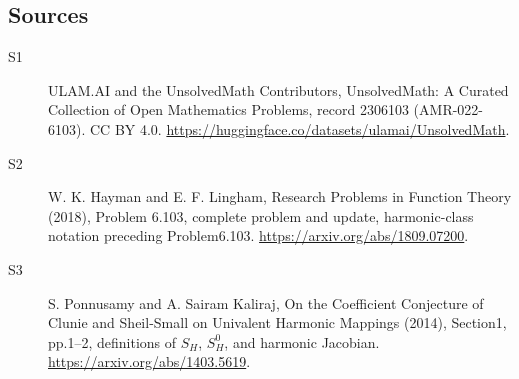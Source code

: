 \documentclass[11pt]{article}
\begin{document}
\subsection{Sources}
\begin{description}
\item[\hypertarget{source:2306103:1}{S1}] ULAM.AI and the UnsolvedMath Contributors, UnsolvedMath: A Curated Collection of Open Mathematics Problems, record 2306103 (AMR-022-6103). CC BY 4.0. \url{https://huggingface.co/datasets/ulamai/UnsolvedMath}.
\item[\hypertarget{source:2306103:2}{S2}] W. K. Hayman and E. F. Lingham, Research Problems in Function Theory (2018), Problem 6.103, complete problem and update, harmonic-class notation preceding Problem6.103. \url{https://arxiv.org/abs/1809.07200}.
\item[\hypertarget{source:2306103:3}{S3}] S. Ponnusamy and A. Sairam Kaliraj, On the Coefficient Conjecture of Clunie and Sheil-Small on Univalent Harmonic Mappings (2014), Section1, pp.1--2, definitions of $S_H$, $S_H^0$, and harmonic Jacobian. \url{https://arxiv.org/abs/1403.5619}.
\end{description}
\label{end:2306103}
\end{document}
